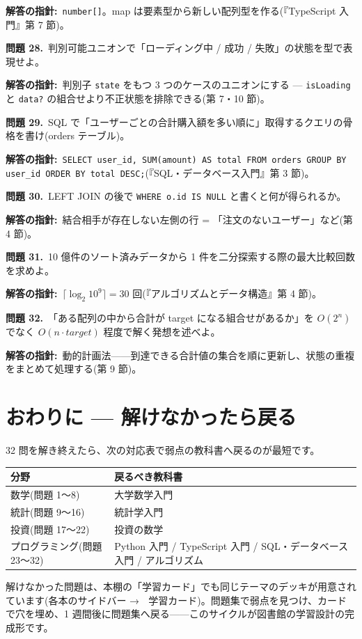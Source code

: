 \documentclass{article}
\begin{document}
\textbf{解答の指針:}\ \texttt{number[]}。map は要素型から新しい配列型を作る(『TypeScript 入門』第 7 節)。

\textbf{問題 28.}\ 判別可能ユニオンで「ローディング中 / 成功 / 失敗」の状態を型で表現せよ。

\textbf{解答の指針:}\ 判別子 \texttt{state} をもつ 3 つのケースのユニオンにする — \texttt{isLoading} と \texttt{data?} の組合せより不正状態を排除できる(第 7・10 節)。

\textbf{問題 29.}\ SQL で「ユーザーごとの合計購入額を多い順に」取得するクエリの骨格を書け(orders テーブル)。

\textbf{解答の指針:}\ \texttt{SELECT user\_id, SUM(amount) AS total FROM orders GROUP BY user\_id ORDER BY total DESC;}(『SQL・データベース入門』第 3 節)。

\textbf{問題 30.}\ LEFT JOIN の後で \texttt{WHERE o.id IS NULL} と書くと何が得られるか。

\textbf{解答の指針:}\ 結合相手が存在しない左側の行 = 「注文のないユーザー」など(第 4 節)。

\textbf{問題 31.}\ 10 億件のソート済みデータから 1 件を二分探索する際の最大比較回数を求めよ。

\textbf{解答の指針:}\ \(\lceil \log_2 10^9 \rceil = 30\) 回(『アルゴリズムとデータ構造』第 4 節)。

\textbf{問題 32.}\ 「ある配列の中から合計が target になる組合せがあるか」を \(O(2^n)\) でなく \(O(n \cdot target)\) 程度で解く発想を述べよ。

\textbf{解答の指針:}\ 動的計画法——到達できる合計値の集合を順に更新し、状態の重複をまとめて処理する(第 9 節)。

\section{おわりに — 解けなかったら戻る}

32 問を解き終えたら、次の対応表で弱点の教科書へ戻るのが最短です。

\begin{center}
\begin{tabular}{|l|l|}
\hline
分野 & 戻るべき教科書 \\
\hline
数学(問題 1〜8) & 大学数学入門 \\
統計(問題 9〜16) & 統計学入門 \\
投資(問題 17〜22) & 投資の数学 \\
プログラミング(問題 23〜32) & Python 入門 / TypeScript 入門 / SQL・データベース入門 / アルゴリズム \\
\hline
\end{tabular}
\end{center}

解けなかった問題は、本棚の「学習カード」でも同じテーマのデッキが用意されています(各本のサイドバー → 🎴 学習カード)。問題集で弱点を見つけ、カードで穴を埋め、1 週間後に問題集へ戻る——このサイクルが図書館の学習設計の完成形です。
\end{document}
